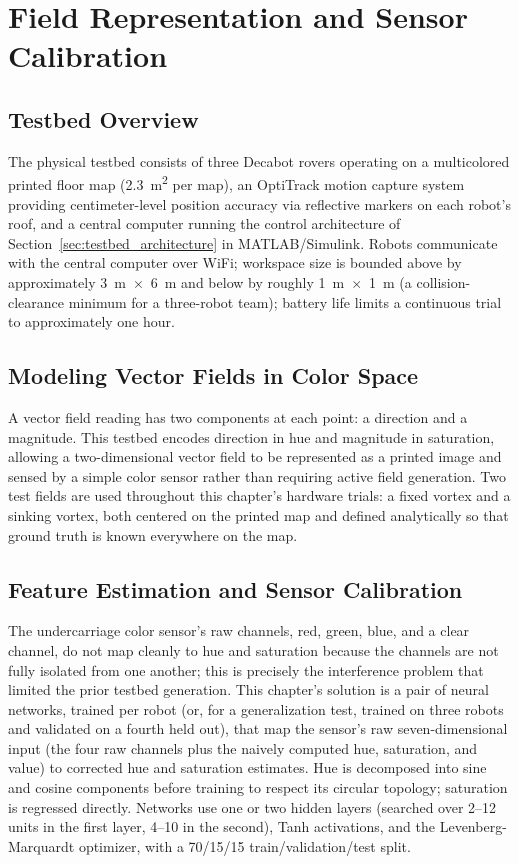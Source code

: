 \documentclass[12pt, letterpaper, oneside]{report}
\begin{document}
\section{Field Representation and Sensor Calibration}
\label{sec:testbed_fields}

\subsection{Testbed Overview}

The physical testbed consists of three Decabot rovers operating on a
multicolored printed floor map (2.3~m\textsuperscript{2} per map), an
OptiTrack motion capture system providing centimeter-level position accuracy
via reflective markers on each robot's roof, and a central computer running
the control architecture of Section~\ref{sec:testbed_architecture} in
MATLAB/Simulink. Robots communicate with the central computer over WiFi;
workspace size is bounded above by approximately 3~m~$\times$~6~m and below
by roughly 1~m~$\times$~1~m (a collision-clearance minimum for a three-robot
team); battery life limits a continuous trial to approximately one hour.

\subsection{Modeling Vector Fields in Color Space}

A vector field reading has two components at each point: a direction and a
magnitude. This testbed encodes direction in hue and magnitude in
saturation, allowing a two-dimensional vector field to be represented as a
printed image and sensed by a simple color sensor rather than requiring
active field generation. Two test fields are used throughout this chapter's
hardware trials: a fixed vortex and a sinking vortex, both centered on the
printed map and defined analytically so that ground truth is known
everywhere on the map.

\subsection{Feature Estimation and Sensor Calibration}

The undercarriage color sensor's raw channels, red, green, blue, and a clear
channel, do not map cleanly to hue and saturation because the channels are
not fully isolated from one another; this is precisely the interference
problem that limited the prior testbed generation. This chapter's solution
is a pair of neural networks, trained per robot (or, for a generalization
test, trained on three robots and validated on a fourth held out), that map
the sensor's raw seven-dimensional input (the four raw channels plus the
naively computed hue, saturation, and value) to corrected hue and saturation
estimates. Hue is decomposed into sine and cosine components before training
to respect its circular topology; saturation is regressed directly. Networks
use one or two hidden layers (searched over 2--12 units in the first layer,
4--10 in the second), Tanh activations, and the Levenberg-Marquardt optimizer,
with a 70/15/15 train/validation/test split.
\end{document}
